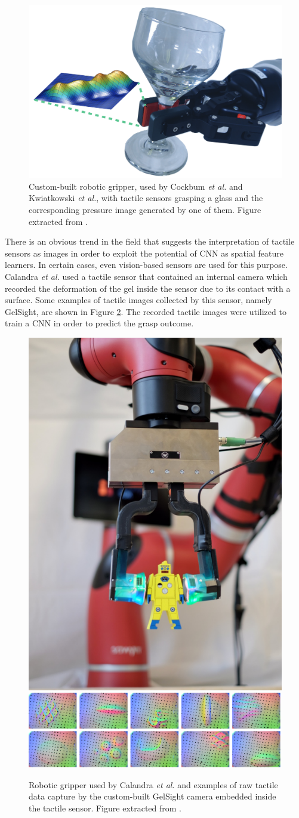\begin{figure}[!htb]
    \centering
    \includegraphics[width=0.8\linewidth]{Figures/Tactile/cockbum2017.png}
    \caption{Custom-built robotic gripper, used by Cockbum \emph{et al.}\cite{Cockbum2017} and Kwiatkowski \emph{et al.}\cite{Kwiatkowski2017}, with tactile sensors grasping a glass and the corresponding pressure image generated by one of them. Figure extracted from \cite{Kwiatkowski2017}.}
    \label{fig:tactile:kwiatkowski2017}
\end{figure}

There is an obvious trend in the field that suggests the interpretation of tactile sensors as images in order to exploit the potential of \ac{CNN} as spatial feature learners. In certain cases, even vision-based sensors are used for this purpose. Calandra \emph{et al.} \cite{Calandra2017} used a tactile sensor that contained an internal camera which recorded the deformation of the gel inside the sensor due to its contact with a surface. Some examples of tactile images collected by this sensor, namely GelSight, are shown in Figure \ref{fig:tactile:calandra2017}. The recorded tactile images were utilized to train a \ac{CNN} in order to predict the grasp outcome.

\begin{figure}[!htb]
    \centering
    \includegraphics[width=0.21\linewidth]{Figures/Tactile/calandrarobot.png}
    \includegraphics[width=0.78\linewidth, clip, trim=0 0 700 0]{Figures/Tactile/calandragelsight.png}
    \caption{Robotic gripper used by Calandra \emph{et al.}\cite{Calandra2017} and examples of raw tactile data capture by the custom-built GelSight camera embedded inside the tactile sensor. Figure extracted from \cite{Calandra2017}.}
    \label{fig:tactile:calandra2017}
\end{figure}

